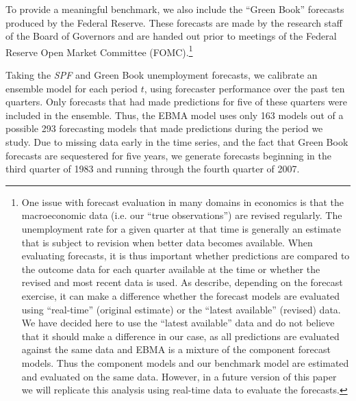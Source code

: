 \documentclass[12pt,fullpage,endnotes]{article}
\begin{document}
To provide a meaningful benchmark, we also include the ``Green Book''
forecasts produced by the Federal Reserve. These forecasts are made by
the research staff of the Board of Governors and are handed out prior
to meetings of the Federal Reserve Open Market Committee
(FOMC).\footnote{One issue with forecast evaluation in many domains in economics is that the macroeconomic data (i.e. our ``true observations'') are revised regularly. The unemployment rate for a given quarter at that time is generally an estimate that is subject to revision when better data becomes available. When evaluating forecasts, it is thus important whether predictions are compared to the outcome data for each quarter available at the time or whether the revised and most recent data is used. As \citet{Croushore:Stark:2001}
  describe, depending on the forecast exercise, it can make a
  difference whether the forecast models are evaluated using
  ``real-time'' (original estimate) or the ``latest available'' (revised) data. We have decided here
  to use the ``latest available'' data and do not believe that it
  should make a difference in our case, as all predictions are
  evaluated against the same data and EBMA is a mixture of the
  component forecast models. Thus the component models and our benchmark model are estimated and evaluated on the same data. However, in a future version of this
  paper we will replicate this analysis using real-time data to
  evaluate the forecasts.} %

Taking the \textit{SPF} and Green Book unemployment forecasts, we
calibrate an ensemble model for each period $t$, using forecaster
performance over the past ten quarters.  Only forecasts that had made
predictions for five of these quarters were included in the ensemble.
Thus, the EBMA model uses only 163 models out of a possible 293
forecasting models that made predictions during the period we study.
Due to missing data early in the time series, and the fact that Green
Book forecasts are sequestered for five years, we generate forecasts
beginning in the third quarter of 1983 and running through the fourth
quarter of 2007.
\end{document}
